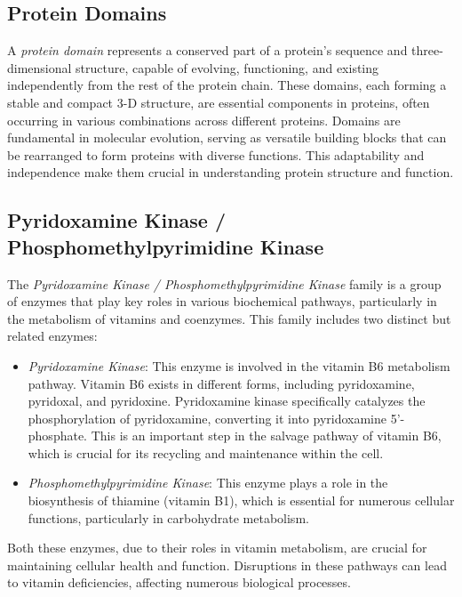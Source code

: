 \documentclass[10pt,twocolumn,letterpaper]{article}
\begin{document}
\subsection{Protein Domains}

A \textit{protein domain} represents a conserved part of a protein's sequence and three-dimensional structure, capable of evolving, functioning, and existing independently from the rest of the protein chain. These domains, each forming a stable and compact 3-D structure, are essential components in proteins, often occurring in various combinations across different proteins. Domains are fundamental in molecular evolution, serving as versatile building blocks that can be rearranged to form proteins with diverse functions. This adaptability and independence make them crucial in understanding protein structure and function.

\subsection{Pyridoxamine Kinase / Phosphomethylpyrimidine Kinase}

The \textit{Pyridoxamine Kinase / Phosphomethylpyrimidine Kinase}\cite{family} family is a group of enzymes that play key roles in various biochemical pathways, particularly in the metabolism of vitamins and coenzymes. This family includes two distinct but related enzymes:

\begin{itemize}
\item \textit{Pyridoxamine Kinase}: This enzyme is involved in the vitamin B6 metabolism pathway. Vitamin B6 exists in different forms, including pyridoxamine, pyridoxal, and pyridoxine. Pyridoxamine kinase specifically catalyzes the phosphorylation of pyridoxamine, converting it into pyridoxamine 5'-phosphate. This is an important step in the salvage pathway of vitamin B6, which is crucial for its recycling and maintenance within the cell.

\item \textit{Phosphomethylpyrimidine Kinase}: This enzyme plays a role in the biosynthesis of thiamine (vitamin B1), which is essential for numerous cellular functions, particularly in carbohydrate metabolism.
\end{itemize}

Both these enzymes, due to their roles in vitamin metabolism, are crucial for maintaining cellular health and function. Disruptions in these pathways can lead to vitamin deficiencies, affecting numerous biological processes.
\end{document}

